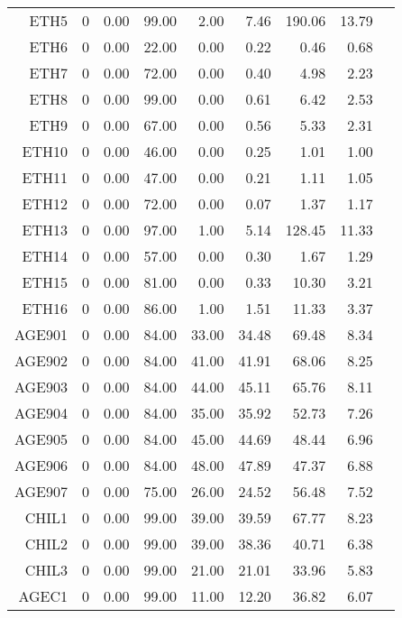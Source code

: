 \begin{longtable}{|rrrrrrrrr|}
	ETH5  &  0  &  0.00  &  99.00  &  2.00  &  7.46  &  190.06  &  13.79 & \\
	ETH6  &  0  &  0.00  &  22.00  &  0.00  &  0.22  &  0.46  &  0.68 & \\
	ETH7  &  0  &  0.00  &  72.00  &  0.00  &  0.40  &  4.98  &  2.23 & \\
	ETH8  &  0  &  0.00  &  99.00  &  0.00  &  0.61  &  6.42  &  2.53 & \\
	ETH9  &  0  &  0.00  &  67.00  &  0.00  &  0.56  &  5.33  &  2.31 & \\
	ETH10  &  0  &  0.00  &  46.00  &  0.00  &  0.25  &  1.01  &  1.00 & \\
	ETH11  &  0  &  0.00  &  47.00  &  0.00  &  0.21  &  1.11  &  1.05 & \\
	ETH12  &  0  &  0.00  &  72.00  &  0.00  &  0.07  &  1.37  &  1.17 & \\
	ETH13  &  0  &  0.00  &  97.00  &  1.00  &  5.14  &  128.45  &  11.33 & \\
	ETH14  &  0  &  0.00  &  57.00  &  0.00  &  0.30  &  1.67  &  1.29 & \\
	ETH15  &  0  &  0.00  &  81.00  &  0.00  &  0.33  &  10.30  &  3.21 & \\
	ETH16  &  0  &  0.00  &  86.00  &  1.00  &  1.51  &  11.33  &  3.37 & \\
	AGE901  &  0  &  0.00  &  84.00  &  33.00  &  34.48  &  69.48  &  8.34 & \\
	AGE902  &  0  &  0.00  &  84.00  &  41.00  &  41.91  &  68.06  &  8.25 & \\
	AGE903  &  0  &  0.00  &  84.00  &  44.00  &  45.11  &  65.76  &  8.11 & \\
	AGE904  &  0  &  0.00  &  84.00  &  35.00  &  35.92  &  52.73  &  7.26 & \\
	AGE905  &  0  &  0.00  &  84.00  &  45.00  &  44.69  &  48.44  &  6.96 & \\
	AGE906  &  0  &  0.00  &  84.00  &  48.00  &  47.89  &  47.37  &  6.88 & \\
	AGE907  &  0  &  0.00  &  75.00  &  26.00  &  24.52  &  56.48  &  7.52 & \\
	CHIL1  &  0  &  0.00  &  99.00  &  39.00  &  39.59  &  67.77  &  8.23 & \\
	CHIL2  &  0  &  0.00  &  99.00  &  39.00  &  38.36  &  40.71  &  6.38 & \\
	CHIL3  &  0  &  0.00  &  99.00  &  21.00  &  21.01  &  33.96  &  5.83 & \\
	AGEC1  &  0  &  0.00  &  99.00  &  11.00  &  12.20  &  36.82  &  6.07 & \\

\end{longtable}
